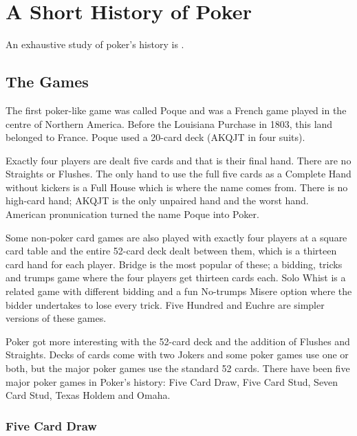 \chapter{A Short History of Poker}

An exhaustive study of poker's history is \citet{McManus}.

\section{The Games}

The first poker-like game was called Poque and was a French game
played in the centre of Northern America. Before the Louisiana
Purchase in 1803, this land belonged to France. Poque used a 20-card
deck (AKQJT in four suits).

Exactly four players are dealt five cards and that is their final
hand. There are no Straights or Flushes. The only hand to use
the full five cards as a Complete Hand without kickers is a Full
House which is where the name comes from. There is no high-card hand;
AKQJT is the only unpaired hand and the worst hand. American
pronunication turned the name Poque into Poker.

Some non-poker card games are also played with exactly four players
at a square card table and the entire 52-card deck dealt between them,
which is a thirteen card hand for each player. Bridge is
the most popular of these; a bidding, tricks and trumps game where the
four players get thirteen cards each. Solo Whist is a related game
with different bidding and a fun No-trumps Misere option where
the bidder undertakes to lose every trick. Five Hundred and Euchre are
simpler versions of these games.

Poker got more interesting with the 52-card deck and the addition of
Flushes and Straights. Decks of cards come with two Jokers and some
poker games use one or both, but the major poker games use the
standard 52 cards. There have been five major poker games in Poker's
history: Five Card Draw, Five Card Stud, Seven Card Stud, Texas Holdem
and Omaha.


\subsection{Five Card Draw}

